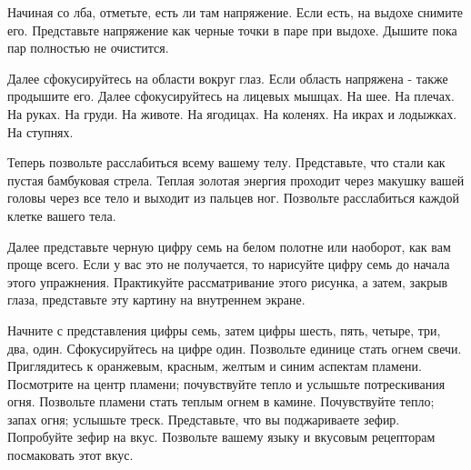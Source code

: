 \documentclass[10pt, fleqn]{article}
\begin{document}
Начиная со лба, отметьте, есть ли там напряжение. Если есть, на выдохе снимите его. Представьте напряжение как черные точки в паре при выдохе. Дышите пока пар полностью не очистится.

Далее сфокусируйтесь на области вокруг глаз. Если область напряжена - также продышите его. Далее сфокусируйтесь на лицевых мышцах. На шее. На плечах. На руках. На груди. На животе. На ягодицах. На коленях. На икрах и лодыжках. На ступнях.

Теперь позвольте расслабиться всему вашему телу. Представьте, что стали как пустая бамбуковая стрела. Теплая золотая энергия проходит через макушку вашей головы через все тело и выходит из пальцев ног. Позвольте расслабиться каждой клетке вашего тела.

Далее представьте черную цифру семь на белом полотне или наоборот, как вам проще всего. Если у вас это не получается, то нарисуйте цифру семь до начала этого упражнения. Практикуйте рассматривание этого рисунка, а затем, закрыв глаза, представьте эту картину на внутреннем экране.

Начните с представления цифры семь, затем цифры шесть, пять, четыре, три, два, один. Сфокусируйтесь на цифре один. Позвольте единице стать огнем свечи. Приглядитесь к оранжевым, красным, желтым и синим аспектам пламени. Посмотрите на центр пламени; почувствуйте тепло и услышьте потрескивания огня. Позвольте пламени стать теплым огнем в камине. Почувствуйте тепло; запах огня; услышьте треск. Представьте, что вы поджариваете зефир. Попробуйте зефир на вкус. Позвольте вашему языку и вкусовым рецепторам посмаковать этот вкус.
\end{document}
